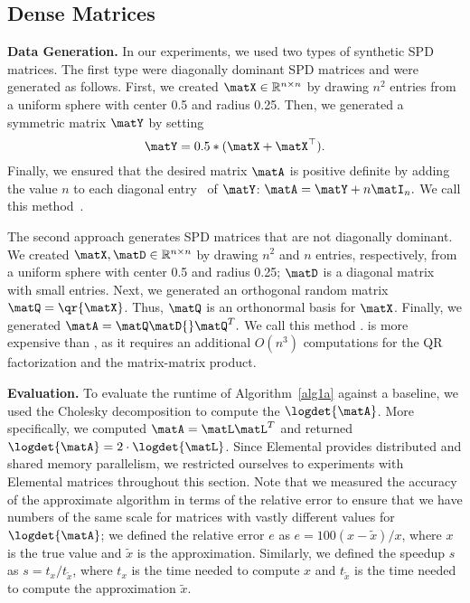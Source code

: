 \subsection{Dense Matrices}
\label{subsec:dense_matrices}
\vspace{0.01in}\noindent \textbf{Data Generation.}
In our experiments, we used two types of synthetic SPD matrices. The first
type were diagonally dominant SPD matrices and were generated as follows.
First, we created $\matX\in{}\mathbb{R}^{n\times{}n}$ by drawing $n^2$ entries from a
uniform sphere with center 0.5 and radius 0.25.
Then, we generated a symmetric matrix $\matY$ by setting
$$\matY=0.5*(\matX+\matX^\top).$$
Finally, we ensured that the desired matrix $\matA$ is positive definite by adding the value $n$ to
each diagonal entry~\cite{curran2009variation} of $\matY$:
$
\matA = \matY + n \matI_n.
$
We call this method~.

The second approach generates SPD matrices that are not diagonally dominant.
We created $\matX,\matD \in{} \mathbb{R}^{n\times{}n}$ by drawing $n^2$ and $n$
entries, respectively, from a uniform sphere with center 0.5 and radius 0.25;
$\matD$ is a diagonal matrix with small entries.
Next, we generated an orthogonal random matrix $\matQ = \qr{\matX}$. Thus,
$\matQ$ is an orthonormal basis for $\matX$.
Finally, we generated
$
\matA = \matQ\matD{}\matQ^T.
$
We call this method .
 is more expensive than , as it requires
an additional $O(n^3)$ computations for the QR factorization and the
matrix-matrix product.

\vspace{0.02in}\noindent \textbf{Evaluation.}
To evaluate the runtime of Algorithm~\ref{alg1a} against a baseline, we used the Cholesky decomposition
to compute the $\logdet{\matA}$. More specifically, we computed $\matA = \matL\matL^T$ and
returned $\logdet{\matA} = 2\cdot\logdet{\matL}$.
Since Elemental provides distributed and shared memory parallelism, we restricted
ourselves to experiments with Elemental matrices throughout this section.
Note that we measured the accuracy of the approximate algorithm in terms of the
relative error to ensure that we have numbers of the same scale for matrices
with vastly different values for $\logdet{\matA}$;
we defined the relative error $e$ as $e =
100(x-\tilde{x})/x$, where $x$ is the true value and
$\tilde{x}$ is the approximation.
Similarly, we defined the speedup $s$ as $s = t_x/t_{\tilde{x}}$,
where $t_x$ is the time needed to compute $x$ and $t_{\tilde{x}}$ is the time needed to
compute the approximation $\tilde{x}$.

